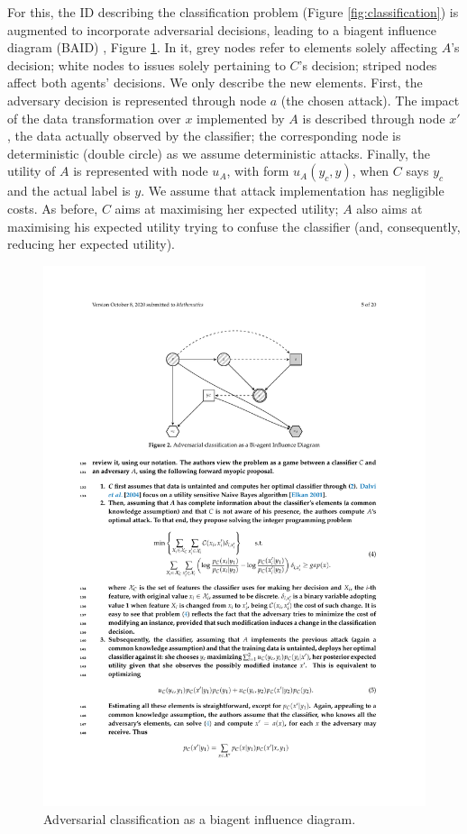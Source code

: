 For this, the ID describing the classification problem (Figure \ref{fig:classification}) is augmented to incorporate adversarial decisions, leading to a biagent influence diagram (BAID) \cite{Banks},
 Figure \ref{fig:jointProblem}. { In it, grey nodes refer to elements solely affecting $A$'s decision; white nodes to issues solely pertaining to $C$'s decision; striped nodes affect both agents' 
decisions}. %
We only describe the new elements. 
First, the adversary decision is represented through node $a$ (the chosen attack). The impact of the data transformation over $x$ implemented by $A$ is described through node $x'$, the data actually observed by the classifier; the 
corresponding node is deterministic 
(double circle) as we assume deterministic attacks.
Finally, the utility of $A$ is represented with node $u_A$,
with form  $u_A(y_c, y)$, when $C$ says $y_c$ and the actual label is $y$.
 We assume that attack implementation has negligible
costs.
As before, $C$ aims at maximising her 
expected utility; $A$ also aims at maximising his expected utility 
trying to confuse the classifier (and, consequently, reducing her 
expected utility). %
\begin{figure}[H]
\centering
\includegraphics[scale=1]{figures/2.pdf}
\caption{Adversarial classification as a biagent influence diagram.}\label{fig:jointProblem}
\end{figure}

